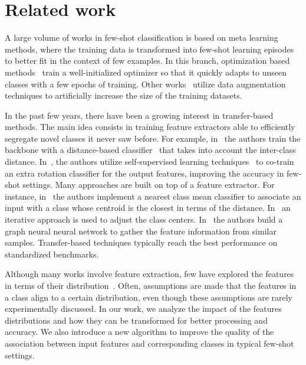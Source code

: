 \documentclass[twoside]{article}
\begin{document}
\section{Related work}
\label{related work}

A large volume of works in few-shot classification is based on meta learning~\cite{thrun2012learning} methods, where the training data is transformed into few-shot learning episodes to better fit in the context of few examples. In this branch, optimization based methods~\cite{thrun2012learning, finn2017model, ravi2016optimization} train a well-initialized optimizer so that it quickly adapts to unseen classes with a few epochs of training. Other works~\cite{zhang2019few,chen2019image} utilize data augmentation techniques to artificially increase the size of the training datasets.

In the past few years, there have been a growing interest in transfer-based methods. The main idea consists in training feature extractors able to efficiently segregate novel classes it never saw before. For example, in~\cite{chen2019closer} the authors train the backbone with a distance-based classifier~\cite{mensink2012metric} that takes into account the inter-class distance. In~\cite{mangla2020charting}, the authors utilize self-supervised learning techniques~\cite{chapelle2009semi}  to co-train an extra rotation classifier for the output features, improving the accuracy in few-shot settings. Many approaches are built on top of a feature extractor. For instance, in~\cite{wang2019simpleshot} the authors implement a nearest class mean classifier to associate an input with a class whose centroid is the closest in terms of the  distance. In~\cite{lichtenstein2020tafssl} an iterative approach is used to adjust the class centers. In~\cite{hu2020exploiting} the authors build a graph neural neural network to gather the feature information from similar samples. Transfer-based techniques typically reach the best performance on standardized benchmarks.

Although many works involve feature extraction, few have explored the features in terms of their distribution~\cite{8462273}. Often, assumptions are made that the features in a class align to a certain distribution, even though these assumptions are rarely experimentally discussed. In our work, we analyze the impact of the features distributions and how they can be transformed for better processing and accuracy. We also introduce a new algorithm to improve the quality of the association between input features and corresponding classes in typical few-shot settings.
\end{document}
